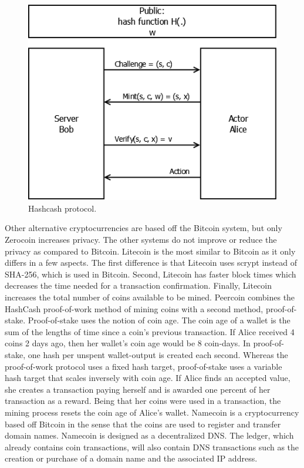 \begin{figure}
\begin{center}
\includegraphics[scale=0.40]{images/hashcash.png}
\caption{Hashcash protocol.}
\label{fig:tor-end-to-end}
\end{center}
\end{figure}

Other alternative cryptocurrencies are based off the Bitcoin system, but only Zerocoin increases privacy. The other systems do not improve or reduce the privacy as compared to Bitcoin. Litecoin is the most similar to Bitcoin as it only differs in a few aspects. The first difference is that Litecoin uses scrypt instead of SHA-256, which is used in Bitcoin. Second, Litecoin has faster block times which decreases the time needed for a transaction confirmation. Finally, Litecoin increases the total number of coins available to be mined. Peercoin combines the HashCash proof-of-work method of mining coins with a second method, proof-of-stake. Proof-of-stake uses the notion of coin age. The coin age of a wallet is the sum of the lengths of time since a coin’s previous transaction. If Alice received 4 coins 2 days ago, then her wallet’s coin age would be 8 coin-days. In proof-of-stake, one hash per unspent wallet-output is created each second. Whereas the proof-of-work protocol uses a fixed hash target, proof-of-stake uses a variable hash target that scales inversely with coin age. If Alice finds an accepted value, she creates a transaction paying herself and is awarded one percent of her transaction as a reward. Being that her coins were used in a transaction, the mining process resets the coin age of Alice’s wallet. Namecoin is a cryptocurrency based off Bitcoin in the sense that the coins are used to register and transfer domain names. Namecoin is designed as a decentralized DNS. The ledger, which already contains coin transactions, will also contain DNS transactions such as the creation or purchase of a domain name and the associated IP address.

